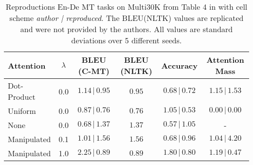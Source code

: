 \begin{table}[h!]
    \caption{Reproductions En-De MT tasks on Multi30K from Table 4 in \cite{pruthi-etal-2020-learning} with cell scheme \textit{author | reproduced}. The BLEU(NLTK) values are replicated and were not provided by the authors. All values are standard deviations over 5 different seeds.}
    \label{tab:seq-to-seq translation results stdv}
    \centering
    \begin{tabular}{lccccc}
    \toprule
      Attention & $\lambda$  & BLEU (C-MT)  & BLEU (NLTK) & Accuracy & Attention Mass\\
      \midrule
      Dot-Product   & 0.0 & $1.14\pmb{\,|\,}0.95$ & $0.95$ & $0.68\pmb{\,|\,}0.72$ & $1.15\pmb{\,|\,}1.53$
      \\
      \midrule
      Uniform   & 0.0 & $0.87\pmb{\,|\,}0.76$ & $0.76$ & $1.05\pmb{\,|\,}0.53$ & $0.00\pmb{\,|\,}0.00$
      \\
      None   & 0.0 & $0.68\pmb{\,|\,}1.37$ & $1.37$ & $0.57\pmb{\,|\,}1.05$ & -
      \\
      \midrule
      Manipulated   & 0.1 & $1.01\pmb{\,|\,}1.56$ & $1.56$ & $0.68\pmb{\,|\,}0.96$ & $1.04\pmb{\,|\,}4.20$
      \\
      Manipulated   & 1.0 & $2.25\pmb{\,|\,}0.89$ & $0.89$ & $1.80\pmb{\,|\,}0.80$ & $1.19\pmb{\,|\,}0.47$
    \\
    \bottomrule
    \end{tabular}
\end{table}
